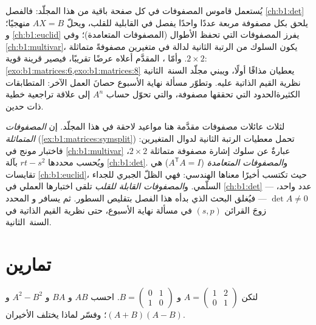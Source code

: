 \begin{remark}
\label{rem:b1:matrices:whereused}
يُستعمل قاموس المصفوفات في كل صفحة باقية من هذا
المجلّد: فالفصل \cref{ch:b1:det} يلحق بكل مصفوفة مربعة عددًا
واحدًا يفصل في القابلية للقلب، ويحلّ $AX = B$
منهجيًا؛ و \cref{ch:b1:euclid} يفرز المصفوفات
التي تحفظ الأطوال (المصفوفات المتعامدة)؛ وفي
\cref{ch:b1:multivar}، يكون السلوك من الرتبة الثانية لدالة في
متغيرين مصفوفةً متماثلة $2 \times 2$. وأمّا ،
المقدَّم أعلاه عرضًا تقريبًا، فيصير قرينة قوية:
\cref{exo:b1:matrices:6,exo:b1:matrices:8} يعطيان مذاقًا أولًا،
ويبني مجلّد السنة~الثانية نظرية القيم الذاتية عليه. وتطوّر مسألة
نهاية الأسبوع حصانَ العمل الآخر: المتطابقات الكثيرةالحدود
التي تحققها مصفوفة، والتي تحوّل حساب $A^n$ إلى
علاقة تراجعية خطية ذات حدين.
\end{remark}

\begin{remark}
\label{rem:b1:matrices:perspectives}
لثلاث عائلات مصفوفات مقدَّمة هنا مواعيد لاحقة في
هذا المجلّد. إن \emph{المصفوفات المتماثلة}
(\cref{ex:b1:matrices:symsplit}) تحمل معطيات الرتبة الثانية لدوال
المتغيرين: فاختبار مونج في
\cref{ch:b1:multivar} عبارةٌ عن سلوك إشارة
مصفوفة متماثلة $2\times2$، ويُحسب محددها $rt - s^2$
بآلة \cref{ch:b1:det}. و\emph{المصفوفات
المتعامدة} ($A^{\mathsf T}A = I$) هي تقايسات
\cref{ch:b1:euclid}، حيث تكتسب  أخيرًا معناها
الهندسي: فهي الظلّ الجبري للجداء
السلّمي. و\emph{المصفوفات القابلة للقلب} تلقى اختبارها العملي
في \cref{ch:b1:det} --- عدد واحد، $\det A \neq 0$ --- فيُغلق
البحث الذي بدأه هذا الفصل بتقليص السطور. ثم يسافر  و
المحدد زوجَ القرائن $(s, p)$ في
مسألة نهاية الأسبوع، حتى نظرية القيم الذاتية في
السنة~الثانية.
\end{remark}

\section{تمارين}

\begin{exercise}[$\star$]\label{exo:b1:matrices:1}
لتكن $A = \begin{pmatrix} 1 & 2 \\ 0 & 1 \end{pmatrix}$ و $B =
\begin{pmatrix} 0 & 1 \\ 1 & 0\end{pmatrix}$. احسب $AB$ و $BA$ و
$A^2 - B^2$ و $(A+B)(A-B)$؛ وفسّر لماذا يختلف الأخيران.
\end{exercise}

